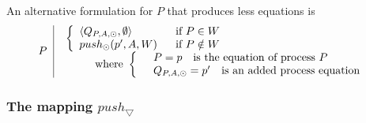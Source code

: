 \documentclass{article}
\begin{document}
An alternative formulation for $P$ that produces less equations is%
\[
\begin{tabular}{l|l}
$P$ & $%
\begin{array}{l}
\left\{ 
\begin{array}{ll}
\left\langle Q_{P,A,\odot },\emptyset \right\rangle & \text{if }P\in W \\ 
push_{\odot }(p^{\prime },A,W) & \text{if }P\notin W%
\end{array}%
\right. \\ 
\qquad \text{where }\left\{ \text{ }%
\begin{array}{l}
P=p\text{ is the equation of process }P \\ 
Q_{P,A,\odot }=p^{\prime }\text{ is an added process equation}%
\end{array}%
\right.%
\end{array}%
$%
\end{tabular}%
\]

\newpage

\subsubsection{The mapping $push_{\bigtriangledown }$}
\end{document}

